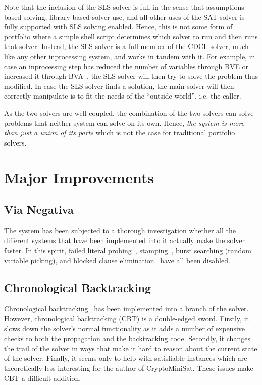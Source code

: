 \documentclass[final]{ieee}
\begin{document}
Note that the inclusion of the SLS solver is full in the sense that assumptions-based solving, library-based solver use, and all other uses of the SAT solver is fully supported with SLS solving enabled. Hence, this is not some form of portfolio where a simple shell script determines which solver to run and then runs that solver. Instead, the SLS solver is a full member of the CDCL solver, much like any other inprocessing system, and works in tandem with it. For example, in case an inprocessing step has reduced the number of variables through BVE or increased it through BVA~\cite{BVA}, the SLS solver will then try to solve the problem thus modified. In case the SLS solver finds a solution, the main solver will then correctly manipulate is to fit the needs of the ``outside world'', i.e. the caller.

As the two solvers are well-coupled, the combination of the two solvers can solve problems that neither system can solve on its own. Hence, \emph{the system is more than just a union of its parts} which is not the case for traditional portfolio solvers.

\section{Major Improvements}
\subsection{Via Negativa}
The system has been subjected to a thorough investigation whether all the different systems that have been implemented into it actually make the solver faster. In this spirit, failed literal probing~\cite{DBLP:conf/ictai/LynceS03}, stamping~\cite{stamping}, burst searching (random variable picking), and blocked clause elimination~\cite{TACAS-2010-JarvisaloBH} have all been disabled.

\subsection{Chronological Backtracking}
Chronological backtracking~\cite{chronobt} has been implemented into a branch of the solver. However, chronological backtracking (CBT) is a double-edged sword. Firstly, it slows down the solver's normal functionality as it adds a number of expensive checks to both the propagation and the backtracking code. Secondly, it changes the trail of the solver in ways that make it hard to reason about the current state of the solver. Finally, it seems only to help with satisfiable instances which are theoretically less interesting for the author of CryptoMiniSat. These issues make CBT a difficult addition.
\end{document}
